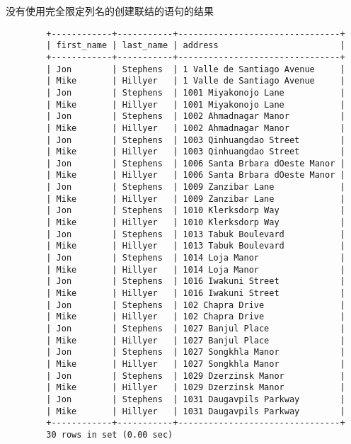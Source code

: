 \documentclass[UTF8]{article}
\begin{document}
\begin{listing}[H]
	\caption{没有使用完全限定列名的创建联结的语句的结果}
	\label{code:faultcartesiancreatejoinclauseresult}
\begin{verbatim}
        +------------+-----------+--------------------------------+
        | first_name | last_name | address                        |
        +------------+-----------+--------------------------------+
        | Jon        | Stephens  | 1 Valle de Santiago Avenue     |
        | Mike       | Hillyer   | 1 Valle de Santiago Avenue     |
        | Jon        | Stephens  | 1001 Miyakonojo Lane           |
        | Mike       | Hillyer   | 1001 Miyakonojo Lane           |
        | Jon        | Stephens  | 1002 Ahmadnagar Manor          |
        | Mike       | Hillyer   | 1002 Ahmadnagar Manor          |
        | Jon        | Stephens  | 1003 Qinhuangdao Street        |
        | Mike       | Hillyer   | 1003 Qinhuangdao Street        |
        | Jon        | Stephens  | 1006 Santa Brbara dOeste Manor |
        | Mike       | Hillyer   | 1006 Santa Brbara dOeste Manor |
        | Jon        | Stephens  | 1009 Zanzibar Lane             |
        | Mike       | Hillyer   | 1009 Zanzibar Lane             |
        | Jon        | Stephens  | 1010 Klerksdorp Way            |
        | Mike       | Hillyer   | 1010 Klerksdorp Way            |
        | Jon        | Stephens  | 1013 Tabuk Boulevard           |
        | Mike       | Hillyer   | 1013 Tabuk Boulevard           |
        | Jon        | Stephens  | 1014 Loja Manor                |
        | Mike       | Hillyer   | 1014 Loja Manor                |
        | Jon        | Stephens  | 1016 Iwakuni Street            |
        | Mike       | Hillyer   | 1016 Iwakuni Street            |
        | Jon        | Stephens  | 102 Chapra Drive               |
        | Mike       | Hillyer   | 102 Chapra Drive               |
        | Jon        | Stephens  | 1027 Banjul Place              |
        | Mike       | Hillyer   | 1027 Banjul Place              |
        | Jon        | Stephens  | 1027 Songkhla Manor            |
        | Mike       | Hillyer   | 1027 Songkhla Manor            |
        | Jon        | Stephens  | 1029 Dzerzinsk Manor           |
        | Mike       | Hillyer   | 1029 Dzerzinsk Manor           |
        | Jon        | Stephens  | 1031 Daugavpils Parkway        |
        | Mike       | Hillyer   | 1031 Daugavpils Parkway        |
        +------------+-----------+--------------------------------+
        30 rows in set (0.00 sec)
\end{verbatim}
\end{listing}
\end{document}
